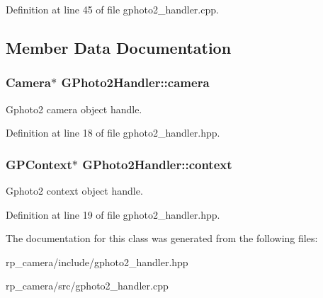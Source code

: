 \-Definition at line 45 of file gphoto2\-\_\-handler.\-cpp.



\subsection{\-Member \-Data \-Documentation}
\hypertarget{class_g_photo2_handler_a44fe83e77887a8dca5532744966e705e}{
\subsubsection[{camera}]{\setlength{\rightskip}{0pt plus 5cm}\-Camera$\ast$ {\bf \-G\-Photo2\-Handler\-::camera}}}\label{class_g_photo2_handler_a44fe83e77887a8dca5532744966e705e}
\-Gphoto2 camera object handle. 

\-Definition at line 18 of file gphoto2\-\_\-handler.\-hpp.

\hypertarget{class_g_photo2_handler_a8f33776112786bccecb6825476ee7789}{
\subsubsection[{context}]{\setlength{\rightskip}{0pt plus 5cm}\-G\-P\-Context$\ast$ {\bf \-G\-Photo2\-Handler\-::context}}}\label{class_g_photo2_handler_a8f33776112786bccecb6825476ee7789}
\-Gphoto2 context object handle. 

\-Definition at line 19 of file gphoto2\-\_\-handler.\-hpp.



\-The documentation for this class was generated from the following files\-:\begin{DoxyCompactItemize}
\item 
rp\-\_\-camera/include/gphoto2\-\_\-handler.\-hpp\item 
rp\-\_\-camera/src/gphoto2\-\_\-handler.\-cpp\end{DoxyCompactItemize}
